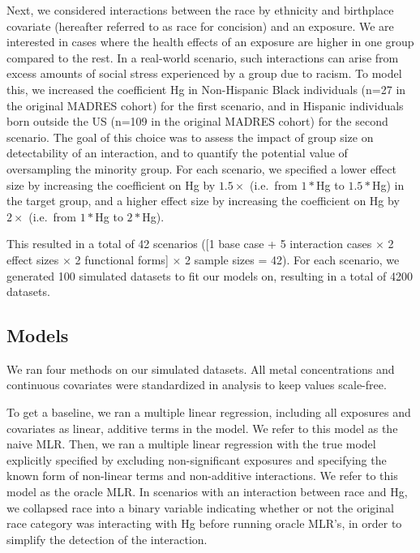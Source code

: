 \documentclass[12pt, twoside]{amherstthesis}
\begin{document}
Next, we considered interactions between the race by ethnicity and birthplace covariate (hereafter referred to as race for concision) and an exposure. We are interested in cases where the health effects of an exposure are higher in one group compared to the rest. In a real-world scenario, such interactions can arise from excess amounts of social stress experienced by a group due to racism. To model this, we increased the coefficient Hg in Non-Hispanic Black individuals (n=27 in the original MADRES cohort) for the first scenario, and in Hispanic individuals born outside the US (n=109 in the original MADRES cohort) for the second scenario. The goal of this choice was to assess the impact of group size on detectability of an interaction, and to quantify the potential value of oversampling the minority group. For each scenario, we specified a lower effect size by increasing the coefficient on Hg by \(1.5\times\) (i.e.~from \(1*\)Hg to \(1.5*\)Hg) in the target group, and a higher effect size by increasing the coefficient on Hg by \(2\times\) (i.e.~from \(1*\)Hg to \(2*\)Hg).

This resulted in a total of 42 scenarios ({[}1 base case + 5 interaction cases \(\times\) 2 effect sizes \(\times\) 2 functional forms{]} \(\times\) 2 sample sizes = 42). For each scenario, we generated 100 simulated datasets to fit our models on, resulting in a total of 4200 datasets.

\hypertarget{models}{%
\subsection{Models}\label{models}}

We ran four methods on our simulated datasets. All metal concentrations and continuous covariates were standardized in analysis to keep values scale-free.

To get a baseline, we ran a multiple linear regression, including all exposures and covariates as linear, additive terms in the model. We refer to this model as the naive MLR. Then, we ran a multiple linear regression with the true model explicitly specified by excluding non-significant exposures and specifying the known form of non-linear terms and non-additive interactions. We refer to this model as the oracle MLR. In scenarios with an interaction between race and Hg, we collapsed race into a binary variable indicating whether or not the original race category was interacting with Hg before running oracle MLR's, in order to simplify the detection of the interaction.
\end{document}
